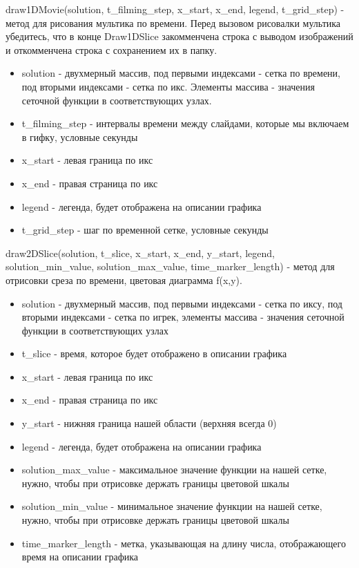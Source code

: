 \documentclass{article}
\begin{document}
\noindent
draw1DMovie(solution, t\_filming\_step, x\_start, x\_end, legend, t\_grid\_step) - метод для рисования мультика по времени. Перед вызовом рисовалки мультика убедитесь, что в конце Draw1DSlice закомменчена строка с выводом изображений и откомменчена строка с сохранением их в папку.
\begin{itemize}
\item solution - двухмерный массив, под первыми индексами - сетка по времени, под вторыми индексами - сетка по икс. Элементы массива - значения сеточной функции в соответствующих узлах.
\item t\_filming\_step - интервалы времени между слайдами, которые мы включаем в гифку, условные секунды
\item x\_start - левая граница по икс
\item x\_end - правая страница по икс
\item legend - легенда, будет отображена на описании графика
\item t\_grid\_step - шаг по временной сетке, условные секунды
\end{itemize}

\noindent 
draw2DSlice(solution, t\_slice, x\_start, x\_end, y\_start, legend, solution\_min\_value, solution\_max\_value, time\_marker\_length) - метод для отрисовки среза по времени, цветовая диаграмма f(x,y).
\begin{itemize}
\item solution - двухмерный массив, под первыми индексами - сетка по иксу, под вторыми индексами - сетка по игрек, элементы массива - значения сеточной функции в соответствующих узлах
\item t\_slice - время, которое будет отображено в описании графика
\item x\_start - левая граница по икс
\item x\_end - правая страница по икс
\item y\_start - нижняя граница нашей области (верхняя всегда 0)
\item legend - легенда, будет отображена на описании графика
\item solution\_max\_value - максимальное значение функции на нашей сетке, нужно, чтобы при отрисовке держать границы цветовой шкалы
\item solution\_min\_value - минимальное значение функции на нашей сетке, нужно, чтобы при отрисовке держать границы цветовой шкалы
\item time\_marker\_length - метка, указывающая на длину числа, отображающего время на описании графика
\end{itemize}
\end{document}
